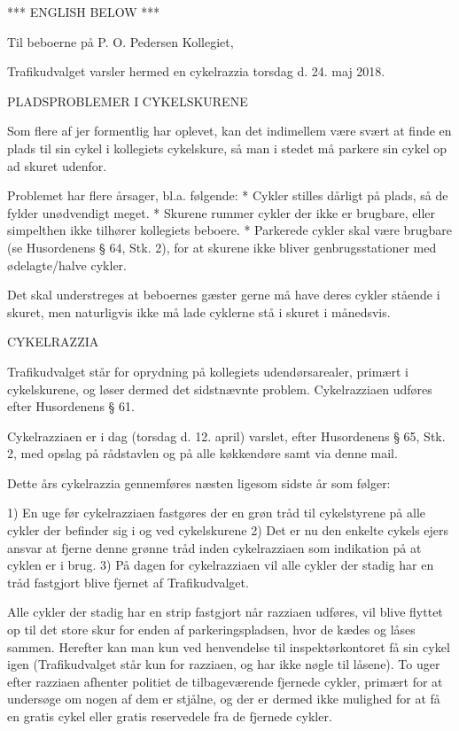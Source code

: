 *** ENGLISH BELOW ***

Til beboerne på P. O. Pedersen Kollegiet,

Trafikudvalget varsler hermed en cykelrazzia torsdag d. 24. maj 2018.


PLADSPROBLEMER I CYKELSKURENE

Som flere af jer formentlig har oplevet, kan det indimellem være svært at finde en plads til sin cykel i kollegiets cykelskure, så man i stedet må parkere sin cykel op ad skuret udenfor.

Problemet har flere årsager, bl.a. følgende:
* Cykler stilles dårligt på plads, så de fylder unødvendigt meget.
* Skurene rummer cykler der ikke er brugbare, eller simpelthen ikke tilhører kollegiets beboere.
* Parkerede cykler skal være brugbare (se Husordenens § 64, Stk. 2), for at skurene ikke bliver genbrugsstationer med ødelagte/halve cykler.

Det skal understreges at beboernes gæster gerne må have deres cykler stående i skuret, men naturligvis ikke må lade cyklerne stå i skuret i månedsvis.


CYKELRAZZIA

Trafikudvalget står for oprydning på kollegiets udendørsarealer, primært i cykelskurene, og løser dermed det sidstnævnte problem. Cykelrazziaen udføres efter Husordenens § 61.

Cykelrazziaen er i dag (torsdag d. 12. april) varslet, efter Husordenens § 65, Stk. 2, med opslag på rådstavlen og på alle køkkendøre samt via denne mail.

Dette års cykelrazzia gennemføres næsten ligesom sidste år som følger:

1) En uge før cykelrazziaen fastgøres der en grøn tråd til cykelstyrene på alle cykler der befinder sig i og ved cykelskurene
2) Det er nu den enkelte cykels ejers ansvar at fjerne denne grønne tråd inden cykelrazziaen som indikation på at cyklen er i brug.
3) På dagen for cykelrazziaen vil alle cykler der stadig har en tråd fastgjort blive fjernet af Trafikudvalget.

Alle cykler der stadig har en strip fastgjort når razziaen udføres, vil blive flyttet op til det store skur for enden af parkeringspladsen, hvor de kædes og låses sammen. Herefter kan man kun ved henvendelse til inspektørkontoret få sin cykel igen (Trafikudvalget står kun for razziaen, og har ikke nøgle til låsene). To uger efter razziaen afhenter politiet de tilbageværende fjernede cykler, primært for at undersøge om nogen af dem er stjålne, og der er dermed ikke mulighed for at få en gratis cykel eller gratis reservedele fra de fjernede cykler.


